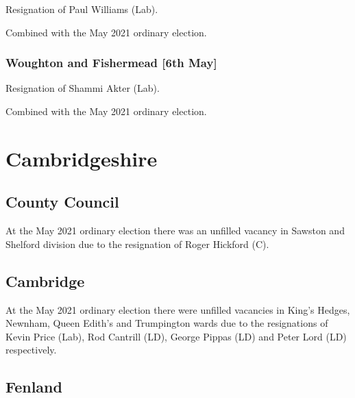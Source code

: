 \documentclass[a4paper,openany]{book}
\begin{document}
\begin{resultsiii}

Resignation of Paul Williams (Lab).

Combined with the May 2021 ordinary election.

\subsubsection*{Woughton and Fishermead \hspace*{\fill}\nolinebreak[1]%
	\enspace\hspace*{\fill}
	[6th May]}


Resignation of Shammi Akter (Lab).

Combined with the May 2021 ordinary election.

\section{Cambridgeshire}

\subsection*{County Council}

At the May 2021 ordinary election there was an unfilled vacancy in Sawston and Shelford division due to the resignation of Roger Hickford (C).

\subsection*{Cambridge}

At the May 2021 ordinary election there were unfilled vacancies in King's Hedges, Newnham, Queen Edith's and Trumpington wards due to the resignations of Kevin Price (Lab), Rod Cantrill (LD), George Pippas (LD) and Peter Lord (LD) respectively.

\subsection*{Fenland}


\end{resultsiii}
\end{document}
